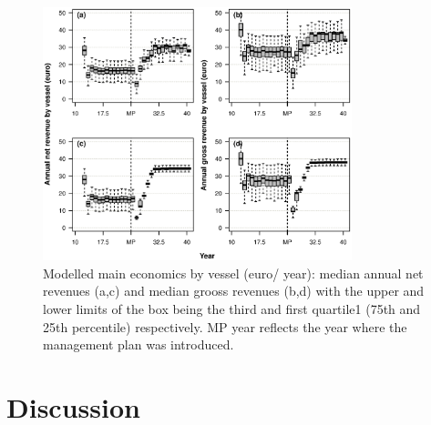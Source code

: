 \documentclass[12pt,oneline,a4paper,numbib]{ouparticle}
\numberwithin{equation}{subsection} %
\begin{document}
\begin{figure}[!ht]
\centering
\includegraphics[width=0.8\textwidth]{Figures/Mean_Economics.eps} 
\caption{Modelled main economics by vessel (euro/ year): median annual net revenues (a,c) and median grooss revenues (b,d) with the upper and lower limits of the box being the third and first quartile1 (75th and 25th percentile) respectively. MP year reflects the year where the management plan was introduced.}
\label{f:meanecon}
\end{figure}

\section{Discussion}
\end{document}
